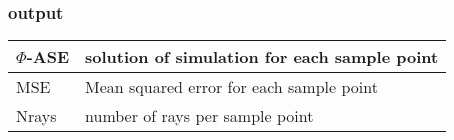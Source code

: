 \subsubsection{output}
\begin{tabular}{| p{3cm} | p{4cm} |}
  \hline
  $\Phi$-ASE & solution of simulation for each sample point \\\hline
  MSE & Mean squared error for each sample point \\\hline
  Nrays & number of rays per sample point \\\hline
\end{tabular}
